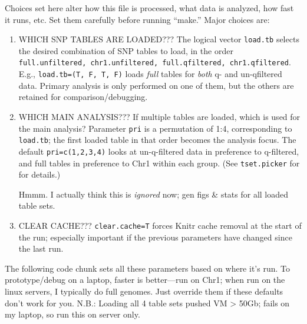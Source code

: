 \documentclass{article}\usepackage[]{graphicx}\usepackage[]{color}
\begin{document}
Choices set here alter how this file is processed, what data is analyzed, how fast it runs, etc.  
Set them carefully before running ``make.''  Major choices are:
\begin{enumerate}

  \item WHICH SNP TABLES ARE LOADED???  The logical vector {\tt load.tb} selects the desired 
    combination of SNP tables to load, in the  order
      {\tt full.unfiltered, chr1.unfiltered, full.qfiltered,  chr1.qfiltered}.   
    E.g., {\tt load.tb=(T, F, T, F)} loads \emph{full} tables for \emph{both} q- and un-qfiltered 
    data.  Primary analysis is only performed on one of them, but the others are retained for 
    comparison/debugging.
    
  \item WHICH MAIN ANALYSIS???  If multiple tables are loaded, which is used for the main analysis? 
    Parameter {\tt pri} is a permutation of 1:4, corresponding to {\tt load.tb}; the first loaded
    table in that order becomes the analysis focus.  The default {\tt pri=c(1,2,3,4)} looks at 
    un-q-filtered data in preference to q-filtered, and full tables in preference to Chr1 within 
    each group.   (See {\tt tset.picker} for for details.)
    
    Hmmm.  I actually think this is \emph{ignored} now; gen figs \& stats for all loaded table sets.

  \item CLEAR CACHE???  {\tt clear.cache=T} forces Knitr cache removal at the start of the run; 
    especially important if the previous parameters have changed since the last run.

\end{enumerate}
The following code chunk sets all these parameters based on where it's run.  To prototype/debug on a
laptop, faster is better---run on Chr1; when run on the linux servers, I 
typically do full genomes.  Just override them if these defaults don't work for you.  
N.B.: Loading all 4 table sets pushed VM > 50Gb; fails on my laptop, so run this on server only.
\end{document}
